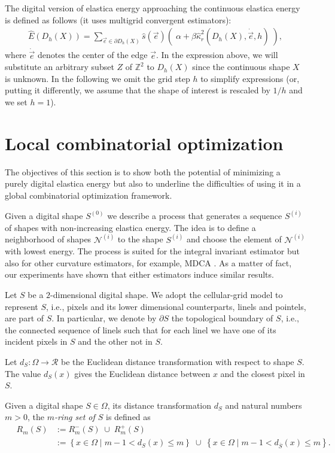 \documentclass[runningheads]{llncs}
\begin{document}
The digital version of elastica energy approaching the continuous elastica energy is defined as follows (it uses multigrid convergent estimators):
\begin{align}
	\hat{E}( D_h(X) ) = \sum_{\vec{e} \in \partial D_h(X)}{ \hat{s}(\vec{e})\left(\; \alpha + \beta \hat{\kappa}_{r}^2(D_h(X),\dot{\vec{e}},h) \; \right)},
	\label{eq:digital-energy}
\end{align}
where $\dot{\vec{e}}$ denotes the center of the edge $\vec{e}$. In the
expression above, we will substitute an arbitrary subset $Z$ of
$\mathbb{Z}^2$ to $D_h(X)$ since the continuous shape $X$ is unknown.
In the following we omit the grid step $h$ to simplify expressions
(or, putting it differently, we assume that the shape of interest is
rescaled by $1/h$ and we set $h=1$).

\section{Local combinatorial optimization}

The objectives of this section is to show both the potential of minimizing a purely digital elastica energy but also to underline the difficulties of using it in a global combinatorial optimization framework.

Given a digital shape $S^{(0)}$ we describe a process that generates a
sequence $S^{(i)}$ of shapes with non-increasing elastica energy. The
idea is to define a neighborhood of shapes $\mathcal{N}^{(i)}$ to the
shape $S^{(i)}$ and choose the element of $\mathcal{N}^{(i)}$ with
lowest energy.  The process is suited for the integral invariant
estimator but also for other curvature estimators, for example, MDCA
\cite{roussillon11mdca}. As a matter of fact, our experiments have
shown that either estimators induce similar results.

Let $S$ be a $2$-dimensional digital shape. We adopt the cellular-grid model to represent $S$, i.e., pixels and its lower dimensional counterparts, linels and pointels, are part of $S$. In particular, we denote by $\partial S$ the topological boundary of $S$, i.e., the connected sequence of linels such that for each linel we have one of its incident pixels in $S$ and the other not in $S$.


Let $d_{S}:\Omega \rightarrow \mathcal{R}$ be the Euclidean distance transformation with respect to shape $S$. The value $d_S(x)$ gives the Euclidean distance between $x$ and the closest pixel in $S$. 

\begin{definition}
Given a digital shape $S\in\Omega$, its distance transformation $d_S$ and natural numbers $m > 0$, the {\em $m$-ring set of $S$} is defined as
\begin{align*}
	\quad R_m(S) &:= R_m^-(S) \; \cup \; R_m^+(S) \\
	&:= \left\{ x \in \Omega \; | \; m-1 < d_S(x) \leq m \right\} \; \cup \;  \left\{ x \in \Omega \; | \; 	m-1 < d_{\overline{S}}(x) \leq m \right\}.
\end{align*}
\end{definition}
\end{document}
